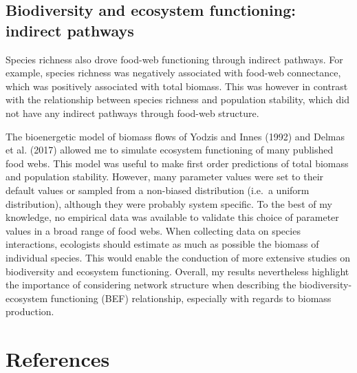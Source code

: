 \documentclass[10pt,oneside]{article}
\begin{document}
\hypertarget{biodiversity-and-ecosystem-functioning-indirect-pathways}{%
\subsection{Biodiversity and ecosystem functioning: indirect
pathways}\label{biodiversity-and-ecosystem-functioning-indirect-pathways}}

Species richness also drove food-web functioning through indirect
pathways. For example, species richness was negatively associated with
food-web connectance, which was positively associated with total
biomass. This was however in contrast with the relationship between
species richness and population stability, which did not have any
indirect pathways through food-web structure.

The bioenergetic model of biomass flows of Yodzis and Innes (1992) and
Delmas et al. (2017) allowed me to simulate ecosystem functioning of
many published food webs. This model was useful to make first order
predictions of total biomass and population stability. However, many
parameter values were set to their default values or sampled from a
non-biased distribution (i.e.~a uniform distribution), although they
were probably system specific. To the best of my knowledge, no empirical
data was available to validate this choice of parameter values in a
broad range of food webs. When collecting data on species interactions,
ecologists should estimate as much as possible the biomass of individual
species. This would enable the conduction of more extensive studies on
biodiversity and ecosystem functioning. Overall, my results nevertheless
highlight the importance of considering network structure when
describing the biodiversity-ecosystem functioning (BEF) relationship,
especially with regards to biomass production.

\hypertarget{references}{%
\section*{References}\label{references}}
\end{document}
